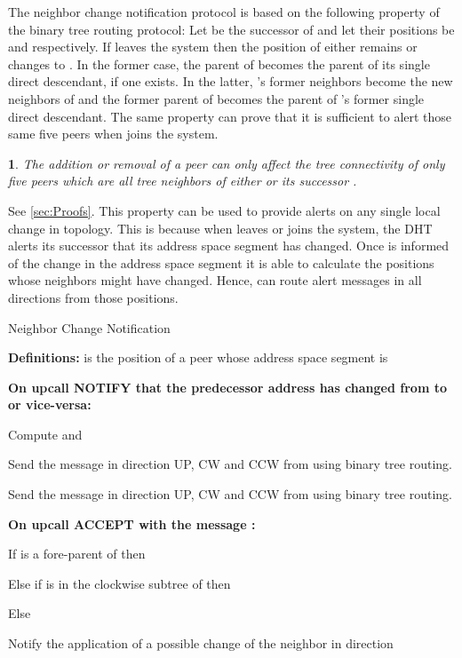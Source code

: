 \documentclass[12pt,english,journal]{elsarticle}
\makeatletter
\numberwithin{equation}{section}
\numberwithin{figure}{section}
\theoremstyle{plain}
\theoremstyle{plain}
\newtheorem{lem}[thm]{\protect\lemmaname}
\newenvironment{proof}[1][\protect\proofname]{\par
\normalfont\topsep6\p@\@plus6\p@\relax
\trivlist
\itemindent\parindent
\item[\hskip\labelsep
\scshape
#1]\ignorespaces
}{\endtrivlist\@endpefalse
}
\providecommand{\proofname}{Proof}
\providecommand{\lemmaname}{Lemma}
\makeatother
\begin{document}
The neighbor change notification protocol is based on the following
property of the binary tree routing protocol: Let  be the
successor of  and let their positions be  and
 respectively. If  leaves the system then the
position of  either remains  or changes to .
In the former case, the parent of  becomes the parent of
its single direct descendant, if one exists. In the latter, 's
former neighbors become the new neighbors of  and the former
parent of  becomes the parent of 's former single
direct descendant. The same property can prove that it is sufficient
to alert those same five peers when  joins the system.
\begin{lem}
The addition or removal of a peer  can only affect the tree
connectivity of only five peers which are all tree neighbors of either
 or its successor .\end{lem}
\begin{proof}
See \ref{sec:Proofs}.
\end{proof}
This property can be used to provide alerts on any single local change
in topology. This is because when  leaves or joins the system,
the DHT alerts its successor that its address space segment has changed.
Once  is informed of the change in the address space segment
it is able to calculate the positions whose neighbors might have changed.
Hence,  can route alert messages in all directions from those
positions.



\begin{algorithm*}
\caption{\label{alg:Change-Notification}Neighbor Change Notification}


\textbf{Definitions:}  is the position of a
peer whose address space segment is 

\textbf{On upcall NOTIFY that the predecessor address has changed
from  to  or vice-versa:}

Compute  and 

Send the message  in
direction UP, CW and CCW from  using binary tree routing.

Send the message  in
direction UP, CW and CCW from  using binary tree routing.

\noindent \begin{raggedright}
\textbf{On upcall ACCEPT with the message :}
\par\end{raggedright}

If  is a fore-parent of  then 

Else if  is in the clockwise subtree of  then 

Else 

Notify the application of a possible change of the neighbor in direction

\end{algorithm*}
\end{document}
